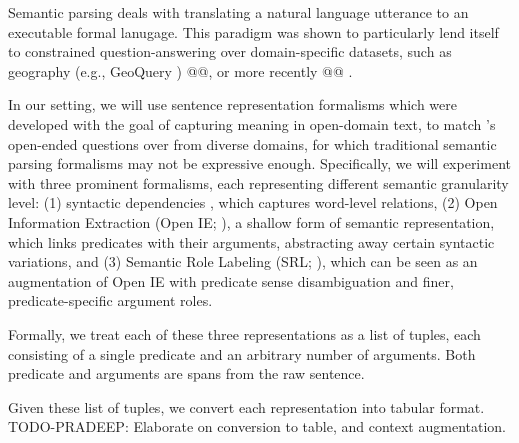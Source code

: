 
Semantic parsing \cite{semantic-parsing}
deals with translating a natural language utterance to
an executable formal lanugage.
This paradigm was shown to particularly lend itself to constrained question-answering
over domain-specific datasets, such as geography (e.g., GeoQuery \cite{geoquery})
@@, or more recently @@ .

In our setting, we will use sentence representation formalisms which were
developed with the goal of capturing meaning in open-domain text, to match \drop's
open-ended questions over from diverse domains,
for which traditional semantic parsing formalisms may not be expressive enough.
Specifically, we will experiment with three prominent formalisms, each
representing different semantic granularity level:
(1) syntactic dependencies \cite{sd}, which captures word-level relations, 
(2) Open Information Extraction (Open IE; \cite{oie}), a shallow
form of semantic representation, which links predicates
with their arguments, abstracting away certain syntactic variations, and
(3) Semantic Role Labeling (SRL; \cite{srl}), which can be seen as an
augmentation of Open IE with predicate sense disambiguation and finer, predicate-specific
argument roles.

Formally, we treat each of these three representations as a list of tuples, each
consisting of a single predicate and an arbitrary number of arguments. Both
predicate and arguments are spans from the raw sentence.

Given these list of tuples, we convert each representation into tabular format.
TODO-PRADEEP: Elaborate on conversion to table, and context augmentation.

